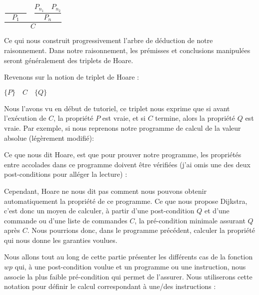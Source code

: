 \begin{center}
$\dfrac{\dfrac{}{\quad P_1\quad} \quad \dfrac{P_{n_1}\quad P_{n_2}}{P_n}}{C}$


\end{center}


Ce qui nous construit progressivement l'arbre de déduction de notre raisonnement.
Dans notre raisonnement, les prémisses et conclusions manipulées seront 
généralement des triplets de Hoare.





Revenons sur la notion de triplet de Hoare :




\begin{center}
$\{ P \}\quad  C\quad \{ Q \}$


\end{center}


Nous l'avons vu en début de tutoriel, ce triplet nous exprime que si avant 
l'exécution de $C$, la propriété $P$ est vraie, et si $C$ termine, alors la
propriété $Q$ est vraie. Par exemple, si nous reprenons notre programme de
calcul de la valeur absolue (légèrement modifié):






Ce que nous dit Hoare, est que pour prouver notre programme, les propriétés
entre accolades dans ce programme doivent être vérifiées (j'ai omis une des
deux post-conditions pour alléger la lecture) :






Cependant, Hoare ne nous dit pas comment nous pouvons obtenir automatiquement la 
propriété  de ce programme. Ce que nous propose Dijkstra, c'est donc un moyen
de calculer, à partir d'une post-condition $Q$ et d'une commande ou d'une liste de 
commandes $C$, la pré-condition minimale assurant $Q$ après $C$. Nous pourrions 
donc, dans le programme précédent, calculer la propriété  qui nous donne les
garanties voulues.



Nous allons tout au long de cette partie présenter les différents cas de la 
fonction $wp$ qui, à une post-condition voulue et un programme ou une instruction,
nous associe la plus faible pré-condition qui permet de l'assurer. Nous utiliserons
cette notation pour définir le calcul correspondant à une/des instructions :



